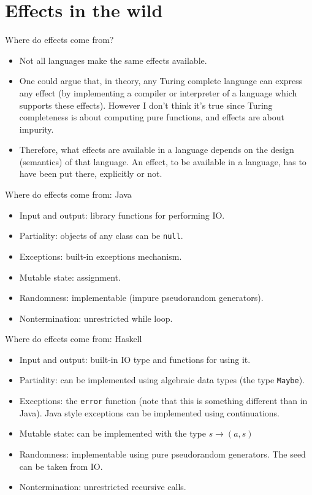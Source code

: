 \documentclass{beamer}
\begin{document}
\section{Effects in the wild}

\begin{frame}{Where do effects come from?}
\begin{itemize}
	\item Not all languages make the same effects available.
	\item One could argue that, in theory, any Turing complete language can express any effect (by implementing a compiler or interpreter of a language which supports these effects). However I don't think it's true since Turing completeness is about computing pure functions, and effects are about impurity.
	\item Therefore, what effects are available in a language depends on the design (semantics) of that language. An effect, to be available in a language, has to have been put there, explicitly or not.
\end{itemize}
\end{frame}

\begin{frame}{Where do effects come from: Java}
\begin{itemize}
	\item Input and output: library functions for performing IO.
	\item Partiality: objects of any class can be \texttt{null}.
	\item Exceptions: built-in exceptions mechanism.
	\item Mutable state: assignment.
	\item Randomness: implementable (impure pseudorandom generators).
	\item Nontermination: unrestricted while loop.
\end{itemize}
\end{frame}

\begin{frame}{Where do effects come from: Haskell}
\begin{itemize}
	\item Input and output: built-in IO type and functions for using it.
	\item Partiality: can be implemented using algebraic data types (the type \texttt{Maybe}).
	\item Exceptions: the \texttt{error} function (note that this is something different than in Java). Java style exceptions can be implemented using continuations.
	\item Mutable state: can be implemented with the type $s \to (a, s)$
	\item Randomness: implementable using pure pseudorandom generators. The seed can be taken from IO.
	\item Nontermination: unrestricted recursive calls.
\end{itemize}
\end{frame}
\end{document}
